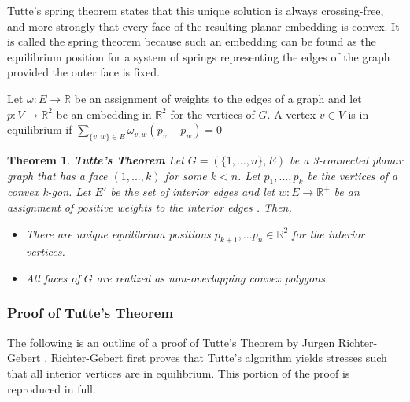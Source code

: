 \documentclass[11pt]{article}
\newcommand{\R}{\mathbb{R}}
\newtheorem{theorem}{Theorem}[section]
\theoremstyle{definition}
\begin{document}
	Tutte's spring theorem states that this unique solution is always crossing-free, and more strongly that every face of the resulting planar embedding is convex. 
	It is called the spring theorem because such an embedding can be found as the equilibrium position for a system of springs representing the edges of the graph provided the outer face is fixed.
 
	Let $\omega : E \rightarrow \R$ be an assignment of weights to the edges of a graph and let $p:V \rightarrow \R^2$ be an embedding in $\R^2$ for the vertices of $G$. 
	A vertex $v \in V$ is in equilibrium if  $\sum\limits_{\{v,w\} \in E} \omega_{v,w}(p_v - p_w) = 0$
 
 	\begin{theorem}{\textbf{Tutte's Theorem}}
 		Let $G = (\{1,...,n\},E)$ be a 3-connected planar graph that has a face $(1,...,k)$ for some $k<n$. Let $p_1,...,p_k$ be the vertices of a convex k-gon. 
		Let $E'$ be the set of interior edges and let $w : E \rightarrow \R^+$ be an assignment of positive weights to the interior edges \cite{realizationSpaces}. Then,
 		\begin{itemize}
			\item There are unique equilibrium positions $p_{k+1}, ...p_n \in \R^2$ for the interior vertices. 
			\item All faces of $G$ are realized as non-overlapping convex polygons.
		\end{itemize}
	\end{theorem}

\subsubsection{Proof of Tutte's Theorem}
The following is an outline of a proof of Tutte's Theorem by Jurgen Richter-Gebert \cite{realizationSpaces}. Richter-Gebert first proves that Tutte's algorithm yields stresses such that all interior vertices are in equilibrium. This portion of the proof is reproduced in full.
\end{document}
